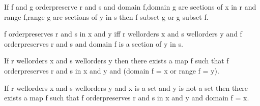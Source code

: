 \documentclass[a4paper,draft]{amsproc}
\begin{document}
\begin{forthel}
\begin{theorem}
If f and g orderpreserve r and s and domain f,domain g are sections of x in r
and range f,range g are sections of y in s then f subset g or g subset f.
\end{theorem}

\begin{definition}
f orderpreserves r and s in x and y iff r wellorders x and s wellorders y and
f orderpreserves r and s and domain f is a section of y in s.
\end{definition}

\begin{theorem}
If r wellorders x and s wellorders y then there exists a map f such that
f orderpreserves r and s in x and y and (domain f = x or range f = y).
\end{theorem}

\begin{theorem}
If r wellorders x and s wellorders y and x is a set and y is not a set
then there exists a %
 map f such that f orderpreserves r and s in x and y
and domain f = x.
\end{theorem}

\end{forthel}
\end{document}
